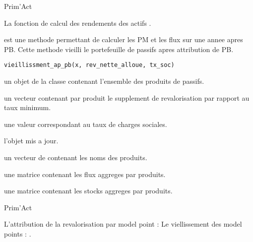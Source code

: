 \documentclass[a4paper]{book}
\begin{document}
%
\begin{Author}\relax
Prim'Act
\end{Author}
%
\begin{SeeAlso}\relax
La fonction de calcul des rendements des actifs .
\end{SeeAlso}
%
\begin{Description}\relax
{} est une methode permettant de calculer les PM et les flux sur une annee apres PB.
Cette methode vieilli le portefeuille de passifs apres attribution de PB.
\end{Description}
%
\begin{Usage}
\begin{verbatim}
vieillissment_ap_pb(x, rev_nette_alloue, tx_soc)
\end{verbatim}
\end{Usage}
%
\begin{Arguments}
\begin{ldescription}
\item[\code{x}] un objet de la classe  contenant l'ensemble des produits de passifs.

\item[\code{rev\_nette\_alloue}] un vecteur  contenant par produit
le supplement de revalorisation par rapport au taux minimum.

\item[\code{tx\_soc}] une valeur  correspondant au taux de charges sociales.
\end{ldescription}
\end{Arguments}
%
\begin{Value}
 l'objet  mis a jour.

 un vecteur de  contenant les noms des produits.

 une matrice contenant les flux aggreges par produits.

 une matrice contenant les stocks aggreges par produits.
\end{Value}
%
\begin{Author}\relax
Prim'Act
\end{Author}
%
\begin{SeeAlso}\relax
L'attribution de la revalorisation par model point : 
Le viellissement des model points : .
\end{SeeAlso}
\end{document}
